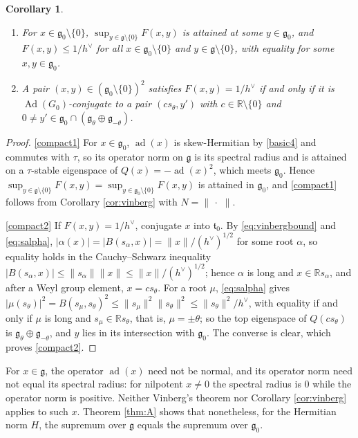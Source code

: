 \documentclass [leqno, 10pt]{amsart}
\newtheorem{corollary}[theorem]{Corollary}%
\theoremstyle{definition}
\numberwithin{equation}{section}
\newcommand{\dum}{\,\cdot\,\,}
\newcommand{\al}{\alpha}
\newcommand{\g}{\mathfrak{g}}
\newcommand{\ad}{\operatorname{ad}}
\newcommand{\Ad}{\operatorname{Ad}}
\newcommand{\rea}{\mathbb R}
\newcommand{\gz}{\g_{0}}
\newcommand{\hv}{h^\vee}
\newcommand{\norm}[1]{\lVert #1\rVert}
\newcommand{\qad}{Q}
\begin{document}
\begin{corollary}\label{thm:compact}
\leavevmode\noindent
\begin{enumerate}[label=(\arabic*), ref=(\arabic*)]
\item\label{compact1} For $x \in \gz\setminus\{0\}$, $\sup_{y \in \g \setminus \{0\}}F(x, y)$ is attained at some $y \in \gz$, and $F(x, y) \leq 1/\hv$ for all $x \in \gz\setminus\{0\}$ and $y \in \g \setminus \{0\}$, with equality for some $x, y \in \gz$.
\item\label{compact2} A pair $(x, y) \in (\gz \setminus \{0\})^{2}$ satisfies $F(x, y) = 1/\hv$ if and only if it is $\Ad(G_{0})$-conjugate to a pair $(c s_{\theta}, y')$ with $c \in \rea \setminus \{0\}$ and $0 \neq y' \in \gz \cap (\g_{\theta} \oplus \g_{-\theta})$.
\end{enumerate}
\end{corollary}

\begin{proof}
\ref{compact1} For $x \in \gz$, $\ad(x)$ is skew-Hermitian by \eqref{basic4} and commutes with $\tau$, so its operator norm on $\g$ is its spectral radius and is attained on a $\tau$-stable eigenspace of $\qad(x) = -\ad(x)^{2}$, which meets $\gz$. Hence $\sup_{y \in \g\setminus\{0\}}F(x, y) = \sup_{y \in \gz\setminus\{0\}}F(x, y)$ is attained in $\gz$, and \ref{compact1} follows from Corollary \ref{cor:vinberg} with $N = \norm{\dum}$.

\ref{compact2} If $F(x, y) = 1/\hv$, conjugate $x$ into $\mathfrak{t}_{0}$. By \eqref{eq:vinbergbound} and \eqref{eq:salpha}, $|\al(x)| = |B(s_{\al}, x)| = \norm{x}/(\hv)^{1/2}$ for some root $\al$, so equality holds in the Cauchy--Schwarz inequality $|B(s_{\al}, x)| \leq \norm{s_{\al}}\norm{x} \leq \norm{x}/(\hv)^{1/2}$; hence $\al$ is long and $x \in \rea s_{\al}$, and after a Weyl group element, $x = cs_{\theta}$. For a root $\mu$, \eqref{eq:salpha} gives $|\mu(s_{\theta})|^{2} = B(s_{\mu}, s_{\theta})^{2} \leq \norm{s_{\mu}}^{2}\norm{s_{\theta}}^{2} \leq \norm{s_{\theta}}^{2}/\hv$, with equality if and only if $\mu$ is long and $s_{\mu} \in \rea s_{\theta}$, that is, $\mu = \pm\theta$; so the top eigenspace of $\qad(cs_{\theta})$ is $\g_{\theta} \oplus \g_{-\theta}$, and $y$ lies in its intersection with $\gz$. The converse is clear, which proves \ref{compact2}.
\end{proof}

For $x \in \g$, the operator $\ad(x)$ need not be normal, and its operator norm need not equal its spectral radius: for nilpotent $x \neq 0$ the spectral radius is $0$ while the operator norm is positive. Neither Vinberg's theorem nor Corollary \ref{cor:vinberg} applies to such $x$. Theorem \ref{thm:A} shows that nonetheless, for the Hermitian norm $H$, the supremum over $\g$ equals the supremum over $\gz$.
\end{document}

